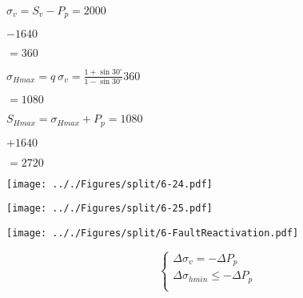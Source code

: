 \documentclass[onecolumn,11pt]{report}
\def\lthtmlcheckvsize{\ifdim\ht\sizebox<\vsize 
  \ifdim\wd\sizebox<\hsize\expandafter\hfill\fi \expandafter\vfill
  \else\expandafter\vss\fi}%
\begin{document}
{\newpage\clearpage
{}%
$\displaystyle \sigma_v = S_v - P_p = 2000$%
\lthtmlindisplaymathZ
\lthtmlcheckvsize\clearpage}

{\newpage\clearpage
{}%
$\displaystyle - 1640$%
\lthtmlindisplaymathZ
\lthtmlcheckvsize\clearpage}

{\newpage\clearpage
{}%
$\displaystyle = 360$%
\lthtmlindisplaymathZ
\lthtmlcheckvsize\clearpage}

{\newpage\clearpage
{}%
$\displaystyle \sigma_{Hmax} = q \: \sigma_v = \frac{1+\sin 30^{\circ}}{1-\sin 30^{\circ}} 360$%
\lthtmlindisplaymathZ
\lthtmlcheckvsize\clearpage}

{\newpage\clearpage
{}%
$\displaystyle = 1080$%
\lthtmlindisplaymathZ
\lthtmlcheckvsize\clearpage}

{\newpage\clearpage
{}%
$\displaystyle S_{Hmax} = \sigma_{Hmax} + P_p = 1080$%
\lthtmlindisplaymathZ
\lthtmlcheckvsize\clearpage}

{\newpage\clearpage
{}%
$\displaystyle + 1640$%
\lthtmlindisplaymathZ
\lthtmlcheckvsize\clearpage}

{\newpage\clearpage
{}%
$\displaystyle = 2720$%
\lthtmlindisplaymathZ
\lthtmlcheckvsize\clearpage}

{\newpage\clearpage
{}%
\texttt{[image: .././Figures/split/6-24.pdf]}%
\lthtmlpictureZ
\lthtmlcheckvsize\clearpage}

{\newpage\clearpage
{}%
\texttt{[image: .././Figures/split/6-25.pdf]}%
\lthtmlpictureZ
\lthtmlcheckvsize\clearpage}

{\newpage\clearpage
{}%
\texttt{[image: .././Figures/split/6-FaultReactivation.pdf]}%
\lthtmlpictureZ
\lthtmlcheckvsize\clearpage}

{\newpage\clearpage
{}%
\begin{displaymath}\left\lbrace
\begin{array}{l}
\Delta \sigma_v = - \Delta P_p \\
\Delta \sigma_{hmin} \leq - \Delta P_p \\
\end{array}
\right.\end{displaymath}%
\lthtmldisplayZ
\lthtmlcheckvsize\clearpage}
\end{document}
